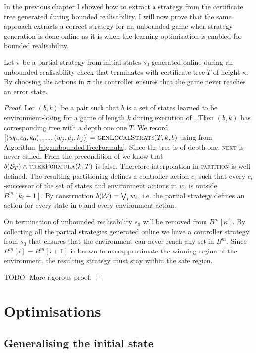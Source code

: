 In the previous chapter I showed how to extract a strategy from the certificate tree generated during bounded realisability. I will now prove that the same approach extracts a correct strategy for an unbounded game when strategy generation is done online as it is when the learning optimisation is enabled for bounded realisability. 

\begin{theorem}
    Let $\pi$ be a partial strategy from initial states $s_0$ generated online during an unbounded realisability check that terminates with certificate tree $T$ of height $\kappa$. By choosing the actions in $\pi$ the controller ensures that the game never reaches an error state.
\end{theorem}
\begin{proof}
    Let $(b, k)$ be a pair such that $b$ is a set of states learned to be environment-losing for a game of length $k$ during execution of . Then $(b, k)$ has corresponding tree with a depth one one $T$. We record $[(w_0, c_0, k_0), \ldots, (w_j, c_j, k_j)] = \textsc{genLocalStrats}(T, k, b)$ using \opptf from Algorithm~\ref{alg:unboundedTreeFormula}. Since the tree is of depth one, \textsc{next} is never called.  From the precondition of  we know that $b(\mathcal{S}_T) \land \textsc{$\overline{\mbox{treeFormula}}$}(k, T)$ is false. Therefore interpolation in \textsc{partition} is well defined. The resulting partitioning defines a controller action $c_i$ such that every $c_i$-successor of the set of states and environment actions in $w_i$ is outside $B^m[k_i-1]$. By construction $b(\mathcal{W}) = \bigvee_i w_i$, i.e. the partial strategy defines an action for every state in $b$ and every environment action.

    On termination of unbounded realisability $s_0$ will be removed from $B^m[\kappa]$. By collecting all the partial strategies generated online we have a controller strategy from $s_0$ that ensures that the environment can never reach any set in $B^m$. Since $B^m[i] = B^m[i+1]$ is known to overapproximate the winning region of the environment, the resulting strategy must stay within the safe region.

    TODO: More rigorous proof.
\end{proof}

\section{Optimisations}

\subsection{Generalising the initial state}

